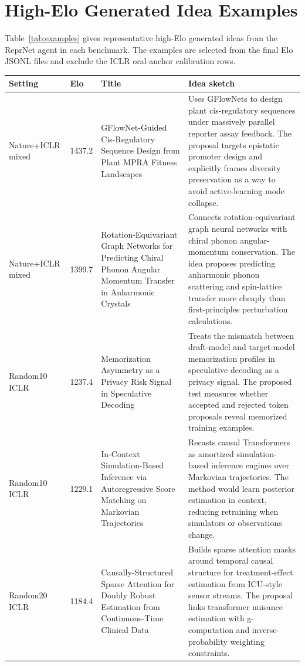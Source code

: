\documentclass[10pt,twocolumn]{article}
\begin{document}
\section{High-Elo Generated Idea Examples}

Table~\ref{tab:examples} gives representative high-Elo generated ideas from
the ReprNet agent in each benchmark.  The examples are selected from the final Elo
JSONL files and exclude the ICLR oral-anchor calibration rows.

\begin{table}[t]
\centering
\scriptsize
\setlength{\tabcolsep}{3pt}
\begin{tabular}{p{}p{}p{}p{}}
\toprule
Setting & Elo & Title & Idea sketch \\
\midrule
Nature+ICLR mixed & 1437.2 & GFlowNet-Guided Cis-Regulatory Sequence Design from Plant MPRA Fitness Landscapes & Uses GFlowNets to design plant cis-regulatory sequences under massively parallel reporter assay feedback.  The proposal targets epistatic promoter design and explicitly frames diversity preservation as a way to avoid active-learning mode collapse. \\
Nature+ICLR mixed & 1399.7 & Rotation-Equivariant Graph Networks for Predicting Chiral Phonon Angular Momentum Transfer in Anharmonic Crystals & Connects rotation-equivariant graph neural networks with chiral phonon angular-momentum conservation.  The idea proposes predicting anharmonic phonon scattering and spin-lattice transfer more cheaply than first-principles perturbation calculations. \\
Random10 ICLR & 1237.4 & Memorization Asymmetry as a Privacy Risk Signal in Speculative Decoding & Treats the mismatch between draft-model and target-model memorization profiles in speculative decoding as a privacy signal.  The proposed test measures whether accepted and rejected token proposals reveal memorized training examples. \\
Random10 ICLR & 1229.1 & In-Context Simulation-Based Inference via Autoregressive Score Matching on Markovian Trajectories & Recasts causal Transformers as amortized simulation-based inference engines over Markovian trajectories.  The method would learn posterior estimation in context, reducing retraining when simulators or observations change. \\
Random20 ICLR & 1184.4 & Causally-Structured Sparse Attention for Doubly Robust Estimation from Continuous-Time Clinical Data & Builds sparse attention masks around temporal causal structure for treatment-effect estimation from ICU-style sensor streams.  The proposal links transformer nuisance estimation with g-computation and inverse-probability weighting constraints. \\

\end{tabular}
\end{table}
\end{document}
